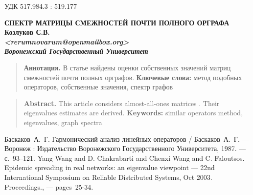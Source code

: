 \documentclass[12pt]{article}
\theoremstyle{definition}
\theoremstyle{plain}
\theoremstyle{remark}
\begin{document}
\setcounter{thm}{0}
\setcounter{lemma}{0}
\quad УДК 517.984.3 : 519.177

\begin{center}
%
\vskip0.5cm
\textbf{СПЕКТР МАТРИЦЫ СМЕЖНОСТЕЙ ПОЧТИ ПОЛНОГО ОРГРАФА}\\
\vskip0.5cm
\textbf{
    \textbf{Козлуков С.В.\footnotemark} \\
    \textit{<rerumnovarum@openmailbox.org>} \\
    \textit{Воронежский Государственный Университет}
}
\end{center}


\begin{quote}
    \small{{\bf Аннотация.}
    В статье найдены оценки собственных значений
    матриц смежностей почти полных орграфов.
    }
    \textbf{Ключевые слова:}
    \small{метод подобных операторов, собственные значения, спектр графов}
\end{quote}

\begin{quote}
    \small{{\bf Abstract.}
    This article considers almost-all-ones matrices
.%
    Their eigenvalues estimates are derived.
    }
    \textbf{Keywords:}
    \small{similar operators method, eigenvalues, graph spectra}
\end{quote}



\begin{thebibliography}{9}
  Баскаков~А.~Г. Гармонический анализ линейных операторов
    / Баскаков~А.~Г.
    --- Воронеж : Издательство Воронежского Государственного Университета,
        1987.
    ---  с.~93--121.
  Yang Wang and D. Chakrabarti and Chenxi Wang and C. Faloutsos.
    Epidemic spreading in real networks: an eigenvalue viewpoint
        --- 22nd International Symposium on Reliable Distributed Systems, Oct 2003. Proceedings., --- pages~25-34.
\end{thebibliography}
\end{document}
